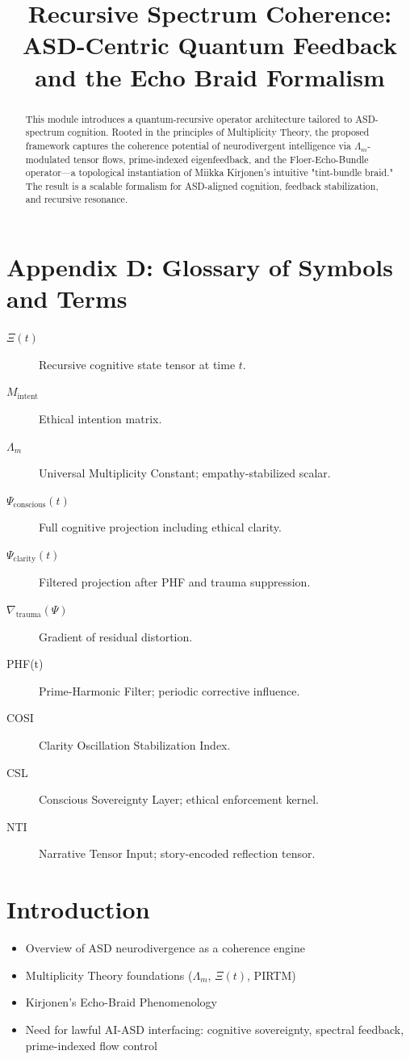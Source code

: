 \documentclass[12pt]{article}
\begin{document}
\section{Appendix D: Glossary of Symbols and Terms}

\begin{description}
  \item[$\Xi(t)$] Recursive cognitive state tensor at time $t$.
  \item[$M_{\text{intent}}$] Ethical intention matrix.
  \item[$\Lambda_m$] Universal Multiplicity Constant; empathy-stabilized scalar.
  \item[$\Psi_{\text{conscious}}(t)$] Full cognitive projection including ethical clarity.
  \item[$\Psi_{\text{clarity}}(t)$] Filtered projection after PHF and trauma suppression.
  \item[$\nabla_{\text{trauma}}(\Psi)$] Gradient of residual distortion.
  \item[PHF(t)] Prime-Harmonic Filter; periodic corrective influence.
  \item[COSI] Clarity Oscillation Stabilization Index.
  \item[CSL] Conscious Sovereignty Layer; ethical enforcement kernel.
  \item[NTI] Narrative Tensor Input; story-encoded reflection tensor.
\end{description}

\title{Recursive Spectrum Coherence: ASD-Centric Quantum Feedback and the Echo Braid Formalism}


\begin{abstract}
This module introduces a quantum-recursive operator architecture tailored to ASD-spectrum cognition. Rooted in the principles of Multiplicity Theory, the proposed framework captures the coherence potential of neurodivergent intelligence via $\Lambda_m$-modulated tensor flows, prime-indexed eigenfeedback, and the Floer-Echo-Bundle operator---a topological instantiation of Miikka Kirjonen's intuitive "tint-bundle braid." The result is a scalable formalism for ASD-aligned cognition, feedback stabilization, and recursive resonance.
\end{abstract}

\section{Introduction}
\begin{itemize}
  \item Overview of ASD neurodivergence as a coherence engine
  \item Multiplicity Theory foundations ($\Lambda_m$, $\Xi(t)$, PIRTM)
  \item Kirjonen's Echo-Braid Phenomenology
  \item Need for lawful AI-ASD interfacing: cognitive sovereignty, spectral feedback, prime-indexed flow control
\end{itemize}
\end{document}
